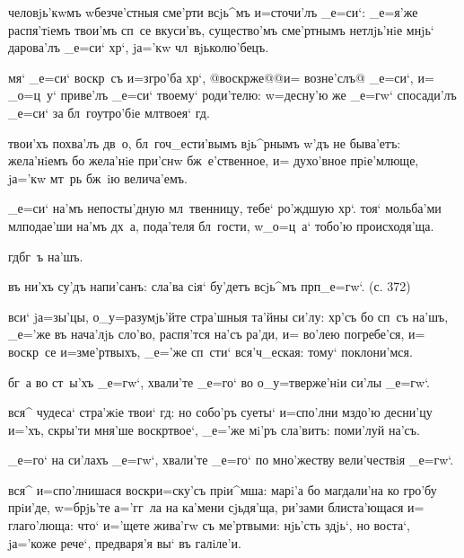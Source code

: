 {{ человjь'кwмъ w\т безче'стныя сме'рти 
всjь^мъ и=сточи'лъ _е=си`: _е=я'же распя'тiемъ твои'мъ 
сп~се вкуси'въ, существо'мъ сме'ртнымъ нетлjь'нiе мнjь` 
дарова'лъ _е=си` хр`, jа='кw чл~вjьколю'бецъ.

 мя` _е=си` воскр~съ и=з\ъ гро'ба хр`, 
@воскр же@{@и= возне'слъ@} _е=си`, и= _о=ц~у` 
приве'лъ _е=си` твоему` роди'телю: w=десну'ю же _е=гw` 
спосади'лъ _е=си` за бл~гоутро'бiе мл твоея` гд.


 твои'хъ похва'лъ дв~о, бл~гоч_ести'вымъ 
вjь^рнымъ w'дъ не быва'етъ: жела'нiемъ бо жела'нiе 
при'снw бж~е'ственное, и= духо'вное прiе'млюще, jа='кw 
мт~рь бж~iю велича'емъ.

 _е=си` на'мъ непосты'дную мл~твенницу, 
тебе` ро'ждшую хр`. тоя` мольба'ми мл подае'ши 
на'мъ дх~а, пода'теля бл~гости, w\т _о=ц~а` тобо'ю 
происходя'ща.

     гд бг~ъ 
на'шъ. 


  въ ни'хъ су'дъ напи'санъ: 
сла'ва сiя` бу'детъ всjь^мъ прп _е=гw`. (с. 372)

 вси` jа=зы'цы, о_у=разумjь'йте стра'шныя 
та'йны си'лу: хр'съ бо сп~съ на'шъ, _е='же въ 
нача'лjь сло'во, распя'тся на'съ ра'ди, и= во'лею 
погребе'ся, и= воскр~се и=з\ъ ме'ртвыхъ, _е='же сп~сти` 
вся'ч_еская: тому` поклони'мся.

  бг~а во ст~ы'хъ _е=гw`, хвали'те 
_е=го` во о_у=тверже'нiи си'лы _е=гw`.

 вся^ чудеса` стра'жiе твои` гд: но 
собо'ръ суеты` и=спо'лни мздо'ю десни'цу и='хъ, скры'ти 
мня'ше воскр твое`, _е='же мi'ръ сла'витъ: поми'луй 
на'съ.

  _е=го` на си'лахъ _е=гw`, 
хвали'те _е=го` по мно'жеству вели'чествiя _е=гw`.

 вся^ и=спо'лнишася воскр и=ску'съ 
прiи^мша: марi'а бо магдали'на ко гро'бу прiи'де, 
w=брjь'те а='гг~ла на ка'мени сjьдя'ща, ри'зами 
блиста'ющася и= глаго'люща: что` и='щете жива'гw съ 
ме'ртвыми: нjь'сть здjь`, но воста`, jа='коже рече`, 
предваря'я вы` въ галiле'и.

}}
